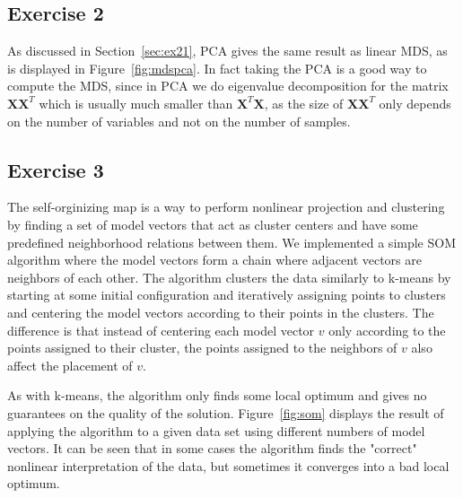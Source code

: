 \documentclass{article}
\renewcommand\vec[1]{\ensuremath{\mathbf{#1}}}
\begin{document}
\subsection{Exercise 2}
As discussed in Section~\ref{sec:ex21}, PCA gives the same result as linear MDS, as is displayed in Figure~\ref{fig:mdspca}.
In fact taking the PCA is a good way to compute the MDS, since in PCA we do eigenvalue decomposition for the matrix $\vec X\vec X^T$ which is usually much smaller than $\vec X^T\vec X$, as the size of $\vec X\vec X^T$ only depends on the number of variables and not on the number of samples.

\subsection{Exercise 3}
The self-orginizing map is a way to perform nonlinear projection and clustering by finding a set of model vectors that act as cluster centers and have some predefined neighborhood relations between them.
We implemented a simple SOM algorithm where the model vectors form a chain where adjacent vectors are neighbors of each other.
The algorithm clusters the data similarly to k-means by starting at some initial configuration and iteratively assigning points to clusters and centering the model vectors according to their points in the clusters.
The difference is that instead of centering each model vector $v$ only according to the points assigned to their cluster, the points assigned to the neighbors of $v$ also affect the placement of $v$.

As with k-means, the algorithm only finds some local optimum and gives no guarantees on the quality of the solution.
Figure~\ref{fig:som} displays the result of applying the algorithm to a given data set using different numbers of model vectors.
It can be seen that in some cases the algorithm finds the "correct" nonlinear interpretation of the data, but sometimes it converges into a bad local optimum.
\end{document}
